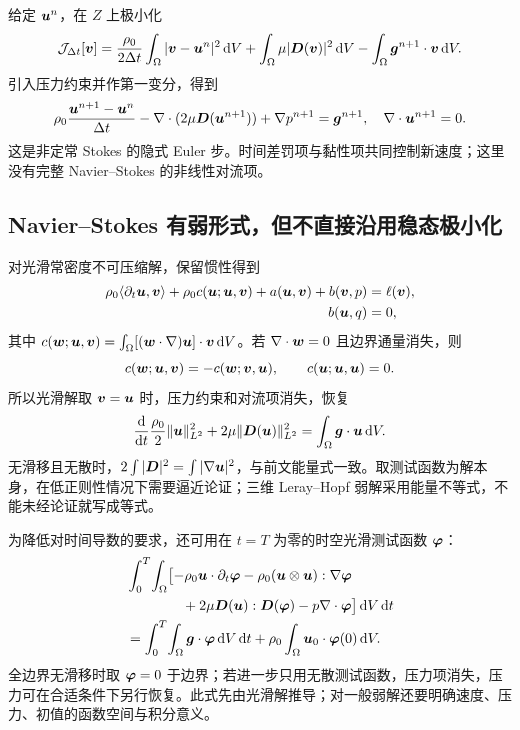 给定 $\bm{u}^n$，在 $Z$ 上极小化
\begin{equation}
 \mathcal J_{\Delta t}[\bm{v}]
 =\frac{\rho_0}{2\Delta t}\int_\Omega|\bm{v}-\bm{u}^n|^2\,\mathrm d V
 +\int_\Omega\mu|\bm{D}(\bm{v})|^2\,\mathrm d V
 -\int_\Omega\bm{g}^{n+1}\cdot\bm{v}\,\mathrm d V.
\end{equation}
引入压力约束并作第一变分，得到
\begin{equation}
 \rho_0\frac{\bm{u}^{n+1}-\bm{u}^n}{\Delta t}
 -\nabla\cdot(2\mu\bm{D}(\bm{u}^{n+1}))+\nabla p^{n+1}
 =\bm{g}^{n+1},\quad\nabla\cdot\bm{u}^{n+1}=0.
\end{equation}
这是非定常 Stokes 的隐式 Euler 步。时间差罚项与黏性项共同控制新速度；这里没有完整 Navier--Stokes 的非线性对流项。

\subsection{Navier--Stokes 有弱形式，但不直接沿用稳态极小化}

对光滑常密度不可压缩解，保留惯性得到
\begin{align}
 \rho_0\langle\partial_t\bm{u},\bm{v}\rangle
 +\rho_0 c(\bm{u};\bm{u},\bm{v})
 +a(\bm{u},\bm{v})+b(\bm{v},p)&=\ell(\bm{v}),\\
 b(\bm{u},q)&=0,
\end{align}
其中 $c(\bm{w};\bm{u},\bm{v})=\int_\Omega[(\bm{w}\cdot\nabla)\bm{u}]\cdot\bm{v}\,\mathrm d V$。若 $\nabla\cdot\bm{w}=0$ 且边界通量消失，则
\begin{equation}
 c(\bm{w};\bm{u},\bm{v})=-c(\bm{w};\bm{v},\bm{u}),
 \qquad c(\bm{u};\bm{u},\bm{u})=0.
\end{equation}
所以光滑解取 $\bm{v}=\bm{u}$ 时，压力约束和对流项消失，恢复
\begin{equation}
 \frac{\mathrm d}{\mathrm dt}\frac{\rho_0}{2}\|\bm{u}\|_{L^2}^2
 +2\mu\|\bm{D}(\bm{u})\|_{L^2}^2
 =\int_\Omega\bm{g}\cdot\bm{u}\,\mathrm d V.
\end{equation}
无滑移且无散时，$2\int|\bm{D}|^2=\int|\nabla\bm{u}|^2$，与前文能量式一致。取测试函数为解本身，在低正则性情况下需要逼近论证；三维 Leray--Hopf 弱解采用能量不等式，不能未经论证就写成等式。

为降低对时间导数的要求，还可用在 $t=T$ 为零的时空光滑测试函数 $\bm{\varphi}$：
\begin{align}
 &\int_0^T\!\int_\Omega\bigl[-\rho_0\bm{u}\cdot\partial_t\bm{\varphi}
 -\rho_0(\bm{u}\otimes\bm{u}):\nabla\bm{\varphi}\notag\\
 &\hspace{4em}+2\mu\bm{D}(\bm{u}):\bm{D}(\bm{\varphi})
 -p\nabla\cdot\bm{\varphi}\bigr]\,\mathrm d V\,\mathrm d t\notag\\
 &=\int_0^T\!\int_\Omega\bm{g}\cdot\bm{\varphi}\,\mathrm d V\,\mathrm d t
 +\rho_0\int_\Omega\bm{u}_0\cdot\bm{\varphi}(0)\,\mathrm d V.
\end{align}
全边界无滑移时取 $\bm{\varphi}=0$ 于边界；若进一步只用无散测试函数，压力项消失，压力可在合适条件下另行恢复。此式先由光滑解推导；对一般弱解还要明确速度、压力、初值的函数空间与积分意义。

